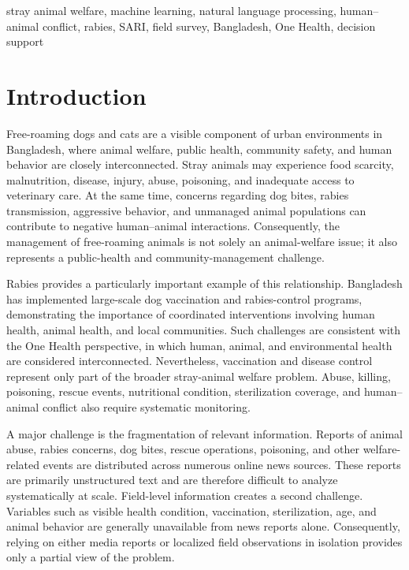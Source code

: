 \documentclass[conference]{IEEEtran}
\begin{document}
\begin{IEEEkeywords}
stray animal welfare, machine learning, natural language processing,
human--animal conflict, rabies, SARI, field survey, Bangladesh,
One Health, decision support
\end{IEEEkeywords}

\section{Introduction}

Free-roaming dogs and cats are a visible component of urban environments in
Bangladesh, where animal welfare, public health, community safety, and human
behavior are closely interconnected. Stray animals may experience food
scarcity, malnutrition, disease, injury, abuse, poisoning, and inadequate
access to veterinary care. At the same time, concerns regarding dog bites,
rabies transmission, aggressive behavior, and unmanaged animal populations
can contribute to negative human--animal interactions. Consequently, the
management of free-roaming animals is not solely an animal-welfare issue; it
also represents a public-health and community-management challenge.

Rabies provides a particularly important example of this relationship.
Bangladesh has implemented large-scale dog vaccination and rabies-control
programs, demonstrating the importance of coordinated interventions involving
human health, animal health, and local communities. Such challenges are
consistent with the One Health perspective, in which human, animal, and
environmental health are considered interconnected. Nevertheless, vaccination
and disease control represent only part of the broader stray-animal welfare
problem. Abuse, killing, poisoning, rescue events, nutritional condition,
sterilization coverage, and human--animal conflict also require systematic
monitoring.

A major challenge is the fragmentation of relevant information. Reports of
animal abuse, rabies concerns, dog bites, rescue operations, poisoning, and
other welfare-related events are distributed across numerous online news
sources. These reports are primarily unstructured text and are therefore
difficult to analyze systematically at scale. Field-level information creates
a second challenge. Variables such as visible health condition, vaccination,
sterilization, age, and animal behavior are generally unavailable from news
reports alone. Consequently, relying on either media reports or localized
field observations in isolation provides only a partial view of the problem.
\end{document}

